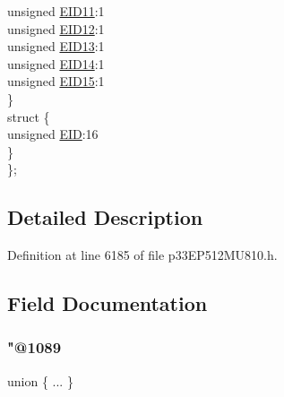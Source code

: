 \begin{DoxyCompactItemize}
\begin{tabbing}
\>\>unsigned \hyperlink{structtag_c2_r_x_f0_e_i_d_b_i_t_s_a710bdb0d602deb021b0be99066008018}{EID11}:1\\
\>\>unsigned \hyperlink{structtag_c2_r_x_f0_e_i_d_b_i_t_s_aa347bb85867bd8d4e0124f7cff8c6472}{EID12}:1\\
\>\>unsigned \hyperlink{structtag_c2_r_x_f0_e_i_d_b_i_t_s_a37d5f3edcbf6ef62f848fd4f3c584f79}{EID13}:1\\
\>\>unsigned \hyperlink{structtag_c2_r_x_f0_e_i_d_b_i_t_s_a7ffc0b0e0d99b8476b6f9a45337c17ab}{EID14}:1\\
\>\>unsigned \hyperlink{structtag_c2_r_x_f0_e_i_d_b_i_t_s_a293cd7dc1746257fa75a60cbd9383cd7}{EID15}:1\\
\>\} \\
\>struct \{\\
\>\>unsigned \hyperlink{structtag_c2_r_x_f0_e_i_d_b_i_t_s_ae80b378c9141f7c03e0b4e55b5f4b54d}{EID}:16\\
\>\} \\
\}; \\

\end{tabbing}\end{DoxyCompactItemize}


\subsection{Detailed Description}


Definition at line 6185 of file p33\+E\+P512\+M\+U810.\+h.



\subsection{Field Documentation}
\mbox{\label{structtag_c2_r_x_f0_e_i_d_b_i_t_s_a773cc5a0e0e5d4593366c4f6eec916d3}} 
\subsubsection{\texorpdfstring{"@1089}{@1089}}
{\footnotesize\ttfamily union \{ ... \} }

\mbox{\label{structtag_c2_r_x_f0_e_i_d_b_i_t_s_ae80b378c9141f7c03e0b4e55b5f4b54d}} 

